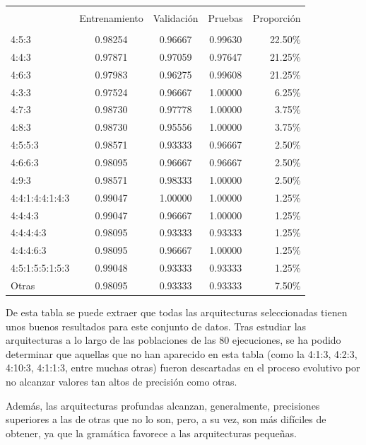 \documentclass[spanish,a4paper,12pt,twoside]{report}
\begin{document}
\begin{center}
  \begin{tabular}{l c c c r}
    \hline \\ [-2ex]
    & Entrenamiento & Validación & Pruebas & Proporción \\ [0.5ex]
    \hline \\ [-1ex]
    4:5:3 & 0.98254 & 0.96667 & 0.99630 & 22.50\% \\
    4:4:3 & 0.97871 & 0.97059 & 0.97647 & 21.25\% \\
    4:6:3 & 0.97983 & 0.96275 & 0.99608 & 21.25\% \\
    4:3:3 & 0.97524 & 0.96667 & 1.00000 & 6.25\% \\ 
    4:7:3 & 0.98730 & 0.97778 & 1.00000 & 3.75\% \\ 
    4:8:3 & 0.98730 & 0.95556 & 1.00000 & 3.75\% \\
    4:5:5:3 & 0.98571 & 0.93333 & 0.96667 & 2.50\% \\
    4:6:6:3 & 0.98095 & 0.96667 & 0.96667 & 2.50\% \\
    4:9:3 & 0.98571 & 0.98333 & 1.00000 & 2.50\% \\ 
    4:4:1:4:4:1:4:3 & 0.99047 & 1.00000 & 1.00000 & 1.25\% \\
    4:4:4:3 & 0.99047 & 0.96667 & 1.00000 & 1.25\% \\
    4:4:4:4:3 & 0.98095 & 0.93333 & 0.93333 & 1.25\% \\
    4:4:4:6:3 & 0.98095 & 0.96667 & 1.00000 & 1.25\% \\
    4:5:1:5:5:1:5:3 & 0.99048 & 0.93333 & 0.93333 & 1.25\% \\ 
    Otras & 0.98095 & 0.93333 & 0.93333 & 7.50\% \\ [1ex]
    \hline
  \end{tabular}
\end{center} \par
  De esta tabla se puede extraer que todas las arquitecturas seleccionadas tienen unos buenos resultados para este conjunto de datos. Tras estudiar las arquitecturas a lo largo de las poblaciones de las 80 ejecuciones, se ha podido determinar que aquellas que no han aparecido en esta tabla (como la 4:1:3, 4:2:3, 4:10:3, 4:1:1:3, entre muchas otras) fueron descartadas en el proceso evolutivo por no alcanzar valores tan altos de precisión como otras. \par
  Además, las arquitecturas profundas alcanzan, generalmente, precisiones superiores a las de otras que no lo son, pero, a su vez, son más difíciles de obtener, ya que la gramática favorece a las arquitecturas pequeñas.
  
\end{document}
